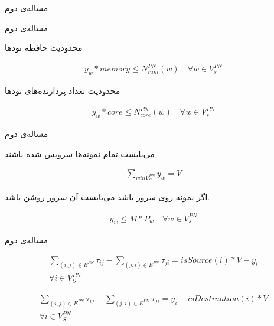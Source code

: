 \documentclass{beamer}
\begin{document}
\begin{persian}
\begin{frame}{مساله‌ی دوم}
\end{frame}
\begin{frame}{مساله‌ی دوم}
	\par
	محدودیت حافظه نودها
	\begin{latin}\begin{align}
		y_{w} * memory \le N_{ram}^{PN}(w)
		\quad
		\forall w \in V_s^{PN}
		\end{align}\end{latin}
	\par
	محدودیت تعداد پردازنده‌های نودها
	\begin{latin}\begin{align}
		y_{w} * core \le N_{core}^{PN}(w)
		\quad
		\forall w \in V_s^{PN}
	\end{align}\end{latin}
\end{frame}
\begin{frame}{مساله‌ی دوم}
	\par
	می‌بایست تمام نمونه‌ها سرویس شده باشند
	\begin{latin}\begin{align}
		\sum_{w in V_{S}^{PN}} y_w = V
	\end{align}\end{latin}
	\par
	اگر نمونه روی سرور  باشد می‌بایست آن سرور روشن باشد.
	\begin{latin}\begin{align}
		y_w \le M * P_w
		\quad
		\forall w \in V_{s}^{PN}
	\end{align}\end{latin}
\end{frame}
\begin{frame}{مساله‌ی دوم}
	\par
	\begin{latin}\begin{align}
		\sum_{(i,j) \in E^{PN}} \tau_{ij} - \sum_{(j,i) \in E^{PN}} \tau_{ji} = isSource(i) * V - y_i \nonumber \\
		\forall i \in V_{S}^{PN}
	\end{align}\end{latin}
	\begin{latin}\begin{align}
		\sum_{(i,j) \in E^{PN}} \tau_{ij} - \sum_{(j,i) \in E^{PN}} \tau_{ji} = y_i - isDestination(i) * V \nonumber \\
		\forall i \in V_{S}^{PN}
	\end{align}\end{latin}

\end{frame}
\end{persian}
\end{document}
